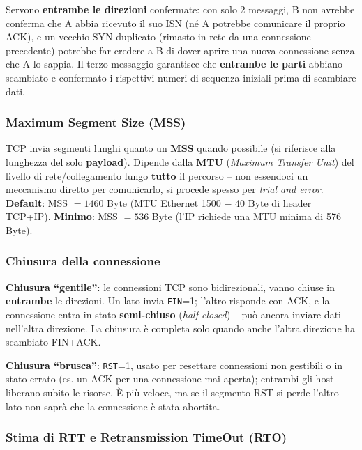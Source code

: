 \documentclass[12pt, a4paper]{article}
\begin{document}
\begin{tcolorbox}[colback=cyan!5, colframe=blue!40!black, title=\textbf{Possibile domanda orale -- perché proprio 3 vie?}]
Servono \textbf{entrambe le direzioni} confermate: con solo 2 messaggi, B non avrebbe conferma che A abbia ricevuto il suo ISN (né A potrebbe comunicare il proprio ACK), e un vecchio SYN duplicato (rimasto in rete da una connessione precedente) potrebbe far credere a B di dover aprire una nuova connessione senza che A lo sappia. Il terzo messaggio garantisce che \textbf{entrambe le parti} abbiano scambiato e confermato i rispettivi numeri di sequenza iniziali prima di scambiare dati.
\end{tcolorbox}

\subsubsection{Maximum Segment Size (MSS)}

TCP invia segmenti lunghi quanto un \textbf{MSS} quando possibile (si riferisce alla lunghezza del solo \textbf{payload}). Dipende dalla \textbf{MTU} (\textit{Maximum Transfer Unit}) del livello di rete/collegamento lungo \textbf{tutto} il percorso -- non essendoci un meccanismo diretto per comunicarlo, si procede spesso per \textit{trial and error}. \textbf{Default}: MSS $=1460$ Byte (MTU Ethernet 1500 $-$ 40 Byte di header TCP+IP). \textbf{Minimo}: MSS $=536$ Byte (l'IP richiede una MTU minima di 576 Byte).

\subsubsection{Chiusura della connessione}

\textbf{Chiusura ``gentile''}: le connessioni TCP sono bidirezionali, vanno chiuse in \textbf{entrambe} le direzioni. Un lato invia \texttt{FIN}=1; l'altro risponde con ACK, e la connessione entra in stato \textbf{semi-chiuso} (\textit{half-closed}) -- può ancora inviare dati nell'altra direzione. La chiusura è completa solo quando anche l'altra direzione ha scambiato FIN+ACK.

\textbf{Chiusura ``brusca''}: \texttt{RST}=1, usato per resettare connessioni non gestibili o in stato errato (es. un ACK per una connessione mai aperta); entrambi gli host liberano subito le risorse. È più veloce, ma se il segmento RST si perde l'altro lato non saprà che la connessione è stata abortita.

\subsubsection{Stima di RTT e Retransmission TimeOut (RTO)}
\end{document}
